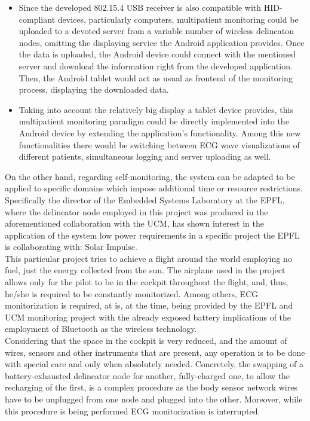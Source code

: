 \begin{itemize}
				\begin{itemize}
					\item Since the developed 802.15.4 USB receiver is also compatible with HID-compliant
						devices, particularly computers, multipatient monitoring could be uploaded to a
						devoted server from a variable number of wireless delineaton nodes, omitting the 
						displaying service the Android application provides. Once the data is uploaded,
						the Android device could connect with the mentioned server and download the information
						right from the developed application. Then, the Android tablet would act as usual
						as frontend of the monitoring process, displaying the downloaded data.

					\item Taking into account the relatively big display a tablet device provides, this
						multipatient monitoring paradigm could be directly implemented into the Android 
						device by extending the application's functionality. Among this new functionalities
						there would be switching between ECG wave visualizations of different patients,
						simultaneous logging and server uploading as well.
				\end{itemize}

				On the other hand, regarding self-monitoring, the system can be adapted to be applied to 
				specific domains which impose additional time or resource restrictions.
				Specifically the director of the Embedded Systems Laboratory at the EPFL, where the delineator 
				node employed in this project was produced in the aforementioned collaboration with the UCM, 
				has shown interest in the application of the system low power requirements in a specific project
				the EPFL is collaborating with: Solar Impulse\cite{solarflight}.\\

				This particular project tries to achieve a flight around the world employing no fuel, just the
				energy collected from the sun. The airplane used in the project allows only for the pilot to be
				in the cockpit throughout the flight, and, thus, he/she is required to be constantly monitorized.
				Among others, ECG monitorization is required, at is, at the time, being provided by the EPFL and
				UCM monitoring project with the already exposed battery implications of the employment of 
				Bluetooth as the wireless	technology.\\

				Considering that the space in the cockpit is very reduced, and the amount of wires, sensors and
				other instruments that are present, any operation is to be done with special care and only when
				absolutely needed. Concretely, the swapping of a battery-exhausted delineator node for another,
				fully-charged one, to allow the recharging of the first, is a complex procedure as the body
				sensor network wires have to be unplugged from one node and plugged into the other. Moreover,
				while this procedure is being performed ECG monitorization is interrupted.\\


\end{itemize}
